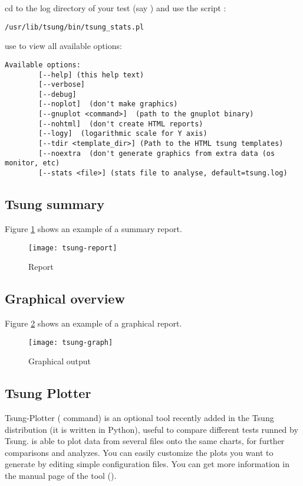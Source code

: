 \documentclass{TSUNG-en}
\begin{document}
cd to the log directory of your test (say
) and use the script
:

\begin{Verbatim}
/usr/lib/tsung/bin/tsung_stats.pl
\end{Verbatim}


use  to view all available options:

\begin{Verbatim}
Available options:
        [--help] (this help text)
        [--verbose]
        [--debug]
        [--noplot]  (don't make graphics)
        [--gnuplot <command>]  (path to the gnuplot binary)
        [--nohtml]  (don't create HTML reports)
        [--logy]  (logarithmic scale for Y axis)
        [--tdir <template_dir>] (Path to the HTML tsung templates)
        [--noextra  (don't generate graphics from extra data (os monitor, etc)
        [--stats <file>] (stats file to analyse, default=tsung.log)
\end{Verbatim}

\subsection{Tsung summary}
Figure \ref{fig:report} shows an example of a summary report.
\begin{figure}[htb]
  \begin{center}
    \texttt{[image: tsung-report]}
    \end{center}
      \caption{Report}
    \label{fig:report}
\end{figure}

\subsection{Graphical overview}

Figure \ref{fig:graph} shows an example of a graphical report.

\begin{figure}[htb]
  \begin{center}
    \texttt{[image: tsung-graph]}
    \end{center}
      \caption{Graphical output}
    \label{fig:graph}
\end{figure}
\subsection{Tsung Plotter}
Tsung-Plotter ( command) is an optional tool recently
added in the Tsung distribution (it is written in Python), useful to
compare different tests runned by Tsung.  is able to
plot data from several  files onto the same charts,
for further comparisons and analyzes. You can easily customize the
plots you want to generate by editing simple configuration files. You
can get more information in the manual page of the tool ().
\end{document}
